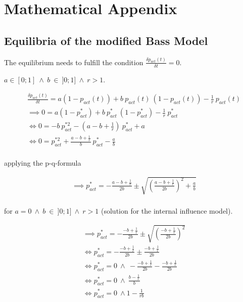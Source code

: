 \documentclass[a4paper,12pt]{article}
\begin{document}
\printbibliography

\section*{Mathematical Appendix}

\subsection*{Equilibria of the modified Bass Model}

The equilibrium needs to fulfill the condition $\frac{\delta p_{act}(t)}{\delta t} = 0$. 

$a \in [0;1] \ \land \ b \ \in \ ]0;1] \ \land \ r > 1$.

\begin{align*}
& \frac{\delta p_{act}(t)}{\delta t} = a (1 - p_{act}(t)) + b \ p_{act}(t) \ (1 - p_{act}(t))  - \frac{1}{r} \ p_{act}(t) \\
&\implies 0 = a (1 - p_{act}^{*}) + b \ p_{act}^{*} \ (1 - p_{act}^{*})  - \frac{1}{r} \ p_{act}^{*} \\
&\iff 0 = - b \ p_{act}^{*2} - (a - b + \frac{1}{r}) \ p_{act}^{*} + a \\
&\iff 0 = p_{act}^{*2} + \frac{a - b + \frac{1}{r}}{b} \ p_{act}^{*} - \frac{a}{b} \\
\end{align*}

applying the p-q-formula

\begin{align*}
&\implies p_{act}^{*} = - \frac{a - b + \frac{1}{r}}{2b} \pm \sqrt{\left( \frac{a - b + \frac{1}{r}}{2b} \right)^2 + \frac{a}{b}} \\
\end{align*}

for $a = 0 \ \land \ b \ \in \ ]0;1] \ \land \ r > 1$ (solution for the internal influence model).

\begin{align*}
&\implies p_{act}^{*} = - \frac{- b + \frac{1}{r}}{2b} \pm \sqrt{\left( \frac{- b + \frac{1}{r}}{2b} \right)^2 } \\
&\iff p_{act}^{*} = - \frac{- b + \frac{1}{r}}{2b} \pm \frac{- b + \frac{1}{r}}{2b} \\
&\iff p_{act}^{*} = 0 \ \land \  - \frac{- b + \frac{1}{r}}{2b} - \frac{- b + \frac{1}{r}}{2b} \\
&\iff p_{act}^{*} = 0 \ \land \  \frac{b - \frac{1}{r}}{b} \\
&\iff p_{act}^{*} = 0 \ \land 1 - \frac{1}{rb} \\
\end{align*}
\end{document}
